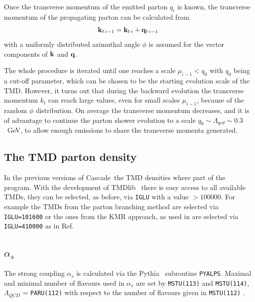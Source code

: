 \documentclass[11pt]{article} \usepackage{mystyle-new}
\newcommand{\PYTHIAMC}{Pythia61}
\def\cascade{{\sc Cascade}}
\def\PYTHIA{{\sc Pythia}}
\def\tmdlib{{\sc TMDlib}}
\begin{document}
Once the transverse momentum of the emitted parton $q_t$ is known, the transverse momentum of the propagating parton can be calculated from
\begin{equation}
{\bf k}_{t\,i-1} = {\bf k}_{t\,i} + {\bf q}_{t\, i-1}
\end{equation}
with a uniformly distributed azimuthal angle $\phi$ is assumed for the vector components of $\bf k$ and $\bf q$.

The whole procedure is iterated until one reaches a scale $\mu_{i-1} < q_0$ with $q_0$ being a cut-off parameter, which can be chosen to be the starting evolution scale of the TMD. However, it turns out that during the backward evolution the transverse momentum $k_t$ can reach large values, even for small scales $\mu_{i-1}$, because of the random $\phi$ distribution. On average the transverse momentum decreases, and it is of advantage to continue the parton shower evolution to a scale $q_0 \sim \Lambda_{qcd} \sim 0.3$~GeV, to allow enough emissions to share the transverse momenta generated.


\subsection{The TMD parton density}

In the previous versions of \cascade\ the TMD densities where part of the program. With the development of \tmdlib ~\cite{Hautmann:2014kza} 
there is easy access to all available TMDs, they can be selected, as before, via \verb+IGLU+ with a value $>100000$.
For example the TMDs from the parton branching method \cite{Hautmann:2017fcj,Hautmann:2017xtx} are selected via  \verb+IGLU=101600+ or the ones from the KMR approach,
as used in are selected via  \verb+IGLU=410000+ as in Ref.~\cite{Bury:2017jxo}



\subsection{$\alpha_s$}
The strong coupling $\alpha_s$ is calculated via the \PYTHIA~\cite{\PYTHIAMC}  subroutine \verb+PYALPS+. 
Maximal and minimal number of flavours used in $\alpha_s$ are set by
\verb+MSTU(113)+ and \verb+MSTU(114)+, $\Lambda_{QCD}$ = \verb+PARU(112)+ with respect to the number of flavours given in
\verb+MSTU(112)+ .
\end{document}
